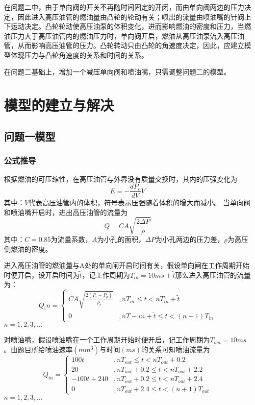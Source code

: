 \documentclass[withoutpreface,bwprint]{cumcmthesis} %
\begin{document}
在问题二中，由于单向阀的开关不再随时间固定的开闭，而由单向阀两边的压力决定，因此进入高压油管的燃油量由凸轮的轮动有关；喷出的流量由喷油嘴的针阀上下运动决定。凸轮轮动使高压油泵的体积变化，进而影响燃油的密度和压力，当燃油压力大于高压油管内的燃油压力时，单向阀开启，燃油从高压油泵流入高压油管，从而影响高压油管的压力。凸轮转动只由凸轮的角速度决定，因此，应建立模型体现压力与凸轮角速度的关系和时间的关系。


在问题二基础上，增加一个减压单向阀和喷油嘴，只需调整问题二的模型。

 
\section{模型的建立与解决}
\subsection{问题一模型}
\subsubsection{公式推导}
根据燃油的可压缩性，在高压油管与外界没有质量交换时，其内的压强变化为
\begin{equation}
	E = -\frac{dP_c}{dV}V
\end{equation}
其中：$V$代表高压油管内的体积，符号表示压强随着体积的增大而减小。
当单向阀和喷油嘴开启时，进出高压油管的流量为
\begin{equation}
	Q = CA\sqrt{\frac{2\Delta P}{\rho}}
\end{equation}
其中：$C = 0.85$为流量系数，$A$为小孔的面积，$\Delta P$为小孔两边的压力差，$\rho$为高压侧燃油的密度。

进入高压油管的燃油量与A处的单向闸开启时间有关，假设单向闸在工作周期开始时便开启，设开启时间为$\widetilde{t}$，记工作周期为$T_{in} = 10ms + \widetilde{t}$那么进入高压油管的流量为：
\begin{equation}
	Q_in = \left\{ 
	\begin{array}{ll}
	CA\sqrt{\frac{2(P_c-P_p)}{\rho_c}}&,nT_{in}\leq t <nT_{in} + \widetilde{t} \\
	0&,nT
	-{in}+\widetilde{t}\leq t <(n+1)T_{in}
	\end{array}
	\right.
\end{equation}
$n = 1,2,3,...$

对喷油嘴，假设喷油嘴在一个工作周期开始时便开启，记工作周期为$T_{out} = 10 ms$。由题目所给喷油速率$(mm^3)$与时间$(ms)$的关系可知喷油流量为
\begin{equation}
Q_{in} = \left\{ 
\begin{array}{ll}
100t&,nT_{out}\leq t<nT_{out}+0.2 \\
20&,nT_{out}+0.2\leq t< nT_{out}+2.2\\
-100t+240&,nT_{out}+0.2\leq t< nT_{out}+2.4\\
0&,nT_{out}+2.4\leq t <(n+1)T_{out}
\end{array}
\right.
\end{equation}
$n = 1,2,3,...$
\end{document}
